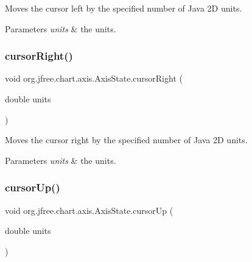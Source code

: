 Moves the cursor left by the specified number of Java 2D units.


\begin{DoxyParams}{Parameters}
{\em units} & the units. \\
\hline
\end{DoxyParams}
\mbox{\label{classorg_1_1jfree_1_1chart_1_1axis_1_1_axis_state_a3f4fd674f0ad48f77c2e3536c63c0b18}} 
\subsubsection{\texorpdfstring{cursor\+Right()}{cursorRight()}}
{\footnotesize\ttfamily void org.\+jfree.\+chart.\+axis.\+Axis\+State.\+cursor\+Right (\begin{DoxyParamCaption}\item[{double}]{units }\end{DoxyParamCaption})}

Moves the cursor right by the specified number of Java 2D units.


\begin{DoxyParams}{Parameters}
{\em units} & the units. \\
\hline
\end{DoxyParams}
\mbox{\label{classorg_1_1jfree_1_1chart_1_1axis_1_1_axis_state_a5b629c585329fc3aeabffae4c1f37ee7}} 
\subsubsection{\texorpdfstring{cursor\+Up()}{cursorUp()}}
{\footnotesize\ttfamily void org.\+jfree.\+chart.\+axis.\+Axis\+State.\+cursor\+Up (\begin{DoxyParamCaption}\item[{double}]{units }\end{DoxyParamCaption})}

